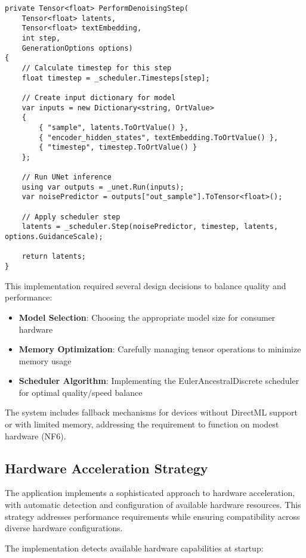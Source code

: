 \begin{verbatim}
private Tensor<float> PerformDenoisingStep(
    Tensor<float> latents, 
    Tensor<float> textEmbedding,
    int step, 
    GenerationOptions options)
{
    // Calculate timestep for this step
    float timestep = _scheduler.Timesteps[step];
    
    // Create input dictionary for model
    var inputs = new Dictionary<string, OrtValue>
    {
        { "sample", latents.ToOrtValue() },
        { "encoder_hidden_states", textEmbedding.ToOrtValue() },
        { "timestep", timestep.ToOrtValue() }
    };
    
    // Run UNet inference
    using var outputs = _unet.Run(inputs);
    var noisePredictor = outputs["out_sample"].ToTensor<float>();
    
    // Apply scheduler step
    latents = _scheduler.Step(noisePredictor, timestep, latents, options.GuidanceScale);
    
    return latents;
}
\end{verbatim}

This implementation required several design decisions to balance quality and performance:

\begin{itemize}
    \item \textbf{Model Selection}: Choosing the appropriate model size for consumer hardware
    \item \textbf{Memory Optimization}: Carefully managing tensor operations to minimize memory usage
    \item \textbf{Scheduler Algorithm}: Implementing the EulerAncestralDiscrete scheduler for optimal quality/speed balance
\end{itemize}

The system includes fallback mechanisms for devices without DirectML support or with limited memory, addressing the requirement to function on modest hardware (NF6).

\subsection{Hardware Acceleration Strategy}
The application implements a sophisticated approach to hardware acceleration, with automatic detection and configuration of available hardware resources. This strategy addresses performance requirements while ensuring compatibility across diverse hardware configurations.

The implementation detects available hardware capabilities at startup:

